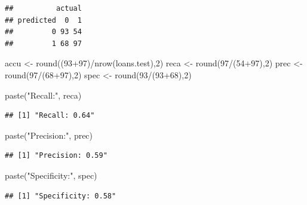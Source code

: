 \documentclass[
]{article}
\newenvironment{Shaded}{\begin{snugshade}}{\end{snugshade}}
\newcommand{\DecValTok}[1]{\textcolor[rgb]{0.00,0.00,0.81}{#1}}
\newcommand{\FunctionTok}[1]{\textcolor[rgb]{0.00,0.00,0.00}{#1}}
\newcommand{\NormalTok}[1]{#1}
\newcommand{\OtherTok}[1]{\textcolor[rgb]{0.56,0.35,0.01}{#1}}
\newcommand{\SpecialCharTok}[1]{\textcolor[rgb]{0.00,0.00,0.00}{#1}}
\newcommand{\StringTok}[1]{\textcolor[rgb]{0.31,0.60,0.02}{#1}}
\begin{document}
\begin{verbatim}
##          actual
## predicted  0  1
##         0 93 54
##         1 68 97
\end{verbatim}

\begin{Shaded}
\begin{Highlighting}[]
\NormalTok{accu }\OtherTok{\textless{}{-}} \FunctionTok{round}\NormalTok{((}\DecValTok{93}\SpecialCharTok{+}\DecValTok{97}\NormalTok{)}\SpecialCharTok{/}\FunctionTok{nrow}\NormalTok{(loans.test),}\DecValTok{2}\NormalTok{)}
\NormalTok{reca }\OtherTok{\textless{}{-}} \FunctionTok{round}\NormalTok{(}\DecValTok{97}\SpecialCharTok{/}\NormalTok{(}\DecValTok{54}\SpecialCharTok{+}\DecValTok{97}\NormalTok{),}\DecValTok{2}\NormalTok{)}
\NormalTok{prec }\OtherTok{\textless{}{-}} \FunctionTok{round}\NormalTok{(}\DecValTok{97}\SpecialCharTok{/}\NormalTok{(}\DecValTok{68}\SpecialCharTok{+}\DecValTok{97}\NormalTok{),}\DecValTok{2}\NormalTok{)}
\NormalTok{spec }\OtherTok{\textless{}{-}} \FunctionTok{round}\NormalTok{(}\DecValTok{93}\SpecialCharTok{/}\NormalTok{(}\DecValTok{93}\SpecialCharTok{+}\DecValTok{68}\NormalTok{),}\DecValTok{2}\NormalTok{)}

\FunctionTok{paste}\NormalTok{(}\StringTok{"Recall:"}\NormalTok{, reca)}
\end{Highlighting}
\end{Shaded}

\begin{verbatim}
## [1] "Recall: 0.64"
\end{verbatim}

\begin{Shaded}
\begin{Highlighting}[]
\FunctionTok{paste}\NormalTok{(}\StringTok{"Precision:"}\NormalTok{, prec)}
\end{Highlighting}
\end{Shaded}

\begin{verbatim}
## [1] "Precision: 0.59"
\end{verbatim}

\begin{Shaded}
\begin{Highlighting}[]
\FunctionTok{paste}\NormalTok{(}\StringTok{"Specificity:"}\NormalTok{, spec)}
\end{Highlighting}
\end{Shaded}

\begin{verbatim}
## [1] "Specificity: 0.58"
\end{verbatim}
\end{document}
